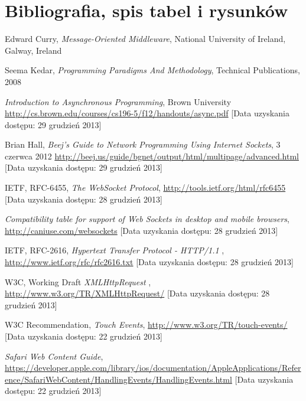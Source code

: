 \newpage
\section{Bibliografia, spis tabel i rysunków}

\begin{thebibliography}{1}
  
  
   Edward Curry, \emph{Message-Oriented Middleware}, National University of Ireland, Galway, Ireland

   Seema Kedar, \emph{Programming Paradigms And Methodology}, Technical Publications, 2008

   \emph{Introduction to Asynchronous Programming}, Brown University \url{http://cs.brown.edu/courses/cs196-5/f12/handouts/async.pdf} [Data uzyskania dostępu: 29 grudzień 2013]

   Brian Hall, \emph{Beej's Guide to Network Programming Using Internet Sockets}, 3 czerwca 2012 \url{http://beej.us/guide/bgnet/output/html/multipage/advanced.html} [Data uzyskania dostępu: 29 grudzień 2013]

   IETF, RFC-6455, \emph{The WebSocket Protocol}, \url{http://tools.ietf.org/html/rfc6455} [Data uzyskania dostępu: 28 grudzień 2013]

   \emph{Compatibility table for support of Web Sockets in desktop and mobile browsers}, \url{http://caniuse.com/websockets} [Data uzyskania dostępu: 28 grudzień 2013]

   IETF, RFC-2616, \emph{Hypertext Transfer Protocol - HTTP/1.1} , \url{http://www.ietf.org/rfc/rfc2616.txt} [Data uzyskania dostępu: 28 grudzień 2013]

   W3C, Working Draft \emph{XMLHttpRequest} , \url{http://www.w3.org/TR/XMLHttpRequest/} [Data uzyskania dostępu: 28 grudzień 2013]

   W3C Recommendation, {\em Touch Events}, \url{http://www.w3.org/TR/touch-events/} [Data uzyskania dostępu: 22 grudzień 2013]
  
   {\em Safari Web Content Guide}, \url{https://developer.apple.com/library/ios/documentation/AppleApplications/Reference/SafariWebContent/HandlingEvents/HandlingEvents.html} [Data uzyskania dostępu: 22 grudzień 2013]
  

\end{thebibliography}
